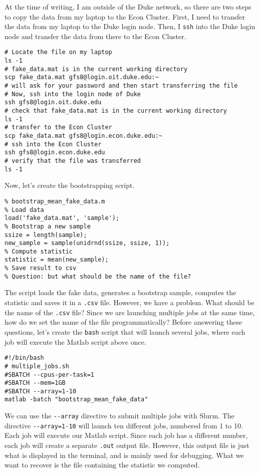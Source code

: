\documentclass[12pt, a4paper]{article}
\begin{document}
At the time of writing, I am outside of the Duke network, so there are two steps to copy the data from my laptop to the Econ Cluster.
First, I need to transfer the data from my laptop to the Duke login node.
Then, I \texttt{ssh} into the Duke login node and transfer the data from there to the Econ Cluster.
\lstset{language=bash,label= ,caption= ,captionpos=b,firstnumber=1,numbers=left,style=bash}
\begin{lstlisting}
# Locate the file on my laptop
ls -1
# fake_data.mat is in the current working directory
scp fake_data.mat gfs8@login.oit.duke.edu:~
# will ask for your password and then start transferring the file
# Now, ssh into the login node of Duke
ssh gfs8@login.oit.duke.edu
# check that fake_data.mat is in the current working directory
ls -1
# transfer to the Econ Cluster
scp fake_data.mat gfs8@login.econ.duke.edu:~
# ssh into the Econ Cluster
ssh gfs8@login.econ.duke.edu
# verify that the file was transferred
ls -1
\end{lstlisting}

Now, let's create the bootstrapping script.
\lstset{language=matlab,label= ,caption= ,captionpos=b,firstnumber=1,numbers=left,style=Matlab-editor}
\begin{lstlisting}
% bootstrap_mean_fake_data.m
% Load data
load('fake_data.mat', 'sample');
% Bootstrap a new sample
ssize = length(sample);
new_sample = sample(unidrnd(ssize, ssize, 1));
% Compute statistic
statistic = mean(new_sample);
% Save result to csv
% Question: but what should be the name of the file?
\end{lstlisting}
The script loads the fake data, generates a bootstrap sample, computes the statistic and saves it in a \texttt{.csv} file.
However, we have a problem. What should be the name of the \texttt{.csv} file?
Since we are launching multiple jobs at the same time, how do we set the name of the file programmatically?
Before answering these questions, let's create the \texttt{bash} script that will launch several jobs, where each job will execute the Matlab script above once.
\lstset{language=bash,label= ,caption= ,captionpos=b,firstnumber=1,numbers=left,style=bash}
\begin{lstlisting}
#!/bin/bash
# multiple_jobs.sh
#SBATCH --cpus-per-task=1
#SBATCH --mem=1GB
#SBATCH --array=1-10
matlab -batch "bootstrap_mean_fake_data"
\end{lstlisting}
We can use the \texttt{-{}-array} directive to submit multiple jobs with Slurm.
The directive \texttt{-{}-array=1-10} will launch ten different jobs, numbered from 1 to 10.
Each job will execute our Matlab script.
Since each job has a different number, each job will create a separate \texttt{.out} output file.
However, this output file is just what is displayed in the terminal, and is mainly used for debugging.
What we want to recover is the file containing the statistic we computed.
\end{document}
